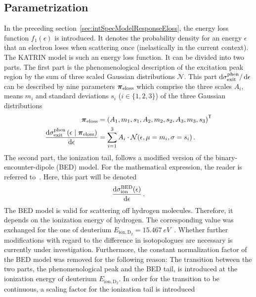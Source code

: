 \subsection{Parametrization}
In the preceding section~\ref{sec:intSpecModelResponseEloss}, the energy loss function $f_1(\epsilon)$ is introduced. It denotes the probability density for an energy $\epsilon$ that an electron loses when scattering once (inelastically in the current context). The KATRIN model is such an energy loss function. It can be divided into two parts. The first part is the phenomenological description of the excitation peak region by the sum of three scaled Gaussian distributions $\mathcal{N}$. This part $\mathop{}\!\mathrm{d}\sigma_\mathrm{exit}^\mathrm{phen}/\mathop{}\!\mathrm{d} \epsilon$  can be described by nine parameters $\boldsymbol{\mathbf{\pi}}_\mathrm{eloss}$ which comprise the three scales $A_i$, means $m_i$ and standard deviations $s_i$ ($i \in \{1,2,3\}$) of the three Gaussian distributions~\cite{Hannen2019_2}
\newcommand{\katrinElossPhen}[1]{
	\frac{
		\d\sigma_\mathrm{exit}^\mathrm{phen}\giventhat*{#1}{\nuisanceParamVec_\mathrm{eloss}}
	}{
		\d \epsilon
	}
}
\begin{align}
\label{eq:katrinElossElossModelParams}
\nuisanceParamVec_\mathrm{eloss} &= 
\transp{\left(
	A_1, m_1, s_1, 
	A_2, m_2, s_2, 
	A_3, m_3, s_3
	\right)} \\
\katrinElossPhen{\epsilon} &=
\sum_{i=1}^3 A_i \cdot \mathcal{N}(\epsilon, \mu=m_i, \sigma=s_i)
\fullstop
\end{align}
The second part, the ionization tail, follows a modified version of the binary-encounter-dipole (BED) model. For the mathematical expression, the reader is referred to~\cite{Kim1994}. Here, this part will be denoted
\newcommand{\katrinElossBDE}[1]{
	\frac{
		\d \sigma_\mathrm{ion}^\mathrm{BED}(#1)
	}{
		\d \epsilon
	}
}%
\newcommand{\ionEnergyDeu}{E_\mathrm{ion,D_2}}%
\begin{equation}
	\katrinElossBDE{\epsilon}
	\fullstop
\end{equation}%
The BED model is valid for scattering off hydrogen molecules. Therefore, it depends on the ionization energy of hydrogen. The corresponding value was exchanged for the one of deuterium $\ionEnergyDeu=\SI{15.467}{eV}$~\cite{Shiner1993}. Whether further modifications with regard to the difference in isotopologues are necessary is currently under investigation. Furthermore, the constant normalization factor of the BED model was removed for the following reason: The transition between the two parts, the phenomenological peak and the BED tail, is introduced at the ionization energy of deuterium $\ionEnergyDeu$. In order for the transition to be continuous, a scaling factor for the ionization tail is introduced
